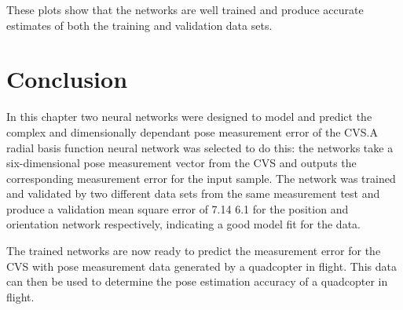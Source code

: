 These plots show that the networks are well trained and produce accurate estimates of both the training and validation data sets. 
\section{Conclusion}

In this chapter two neural networks were designed to model and predict the complex and dimensionally dependant pose measurement error of the CVS.\@ A radial basis function neural network was selected to do this: the networks take a six-dimensional pose measurement vector from the CVS and outputs the corresponding measurement error for the input sample. The network was trained and validated by two different data sets from the same measurement test and produce a validation mean square error of 7.14 6.1 for the position and orientation network respectively, indicating a good model fit for the data. 

The trained networks are now ready to predict the measurement error for the CVS with pose measurement data generated by a quadcopter in flight. This data can then be used to determine the pose estimation accuracy of a quadcopter in flight. 
